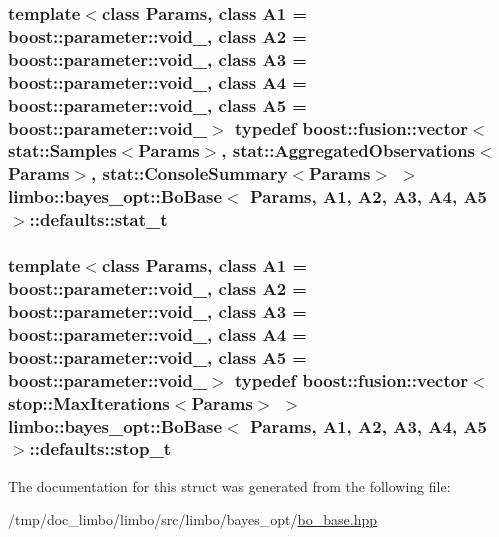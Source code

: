 \subsubsection[{stat\+\_\+t}]{\setlength{\rightskip}{0pt plus 5cm}template$<$class Params, class A1 = boost\+::parameter\+::void\+\_\+, class A2 = boost\+::parameter\+::void\+\_\+, class A3 = boost\+::parameter\+::void\+\_\+, class A4 = boost\+::parameter\+::void\+\_\+, class A5 = boost\+::parameter\+::void\+\_\+$>$ typedef boost\+::fusion\+::vector$<${\bf stat\+::\+Samples}$<$Params$>$, {\bf stat\+::\+Aggregated\+Observations}$<$Params$>$, {\bf stat\+::\+Console\+Summary}$<$Params$>$ $>$ {\bf limbo\+::bayes\+\_\+opt\+::\+Bo\+Base}$<$ Params, A1, A2, A3, A4, A5 $>$\+::{\bf defaults\+::stat\+\_\+t}}\label{structlimbo_1_1bayes__opt_1_1_bo_base_1_1defaults_a70f64f21a85e2fa25063709abd5a2467}
\hypertarget{structlimbo_1_1bayes__opt_1_1_bo_base_1_1defaults_a3cb5d1c8866494a7a641e6f3b4367d75}{}
\subsubsection[{stop\+\_\+t}]{\setlength{\rightskip}{0pt plus 5cm}template$<$class Params, class A1 = boost\+::parameter\+::void\+\_\+, class A2 = boost\+::parameter\+::void\+\_\+, class A3 = boost\+::parameter\+::void\+\_\+, class A4 = boost\+::parameter\+::void\+\_\+, class A5 = boost\+::parameter\+::void\+\_\+$>$ typedef boost\+::fusion\+::vector$<${\bf stop\+::\+Max\+Iterations}$<$Params$>$ $>$ {\bf limbo\+::bayes\+\_\+opt\+::\+Bo\+Base}$<$ Params, A1, A2, A3, A4, A5 $>$\+::{\bf defaults\+::stop\+\_\+t}}\label{structlimbo_1_1bayes__opt_1_1_bo_base_1_1defaults_a3cb5d1c8866494a7a641e6f3b4367d75}


The documentation for this struct was generated from the following file\+:\begin{DoxyCompactItemize}
\item 
/tmp/doc\+\_\+limbo/limbo/src/limbo/bayes\+\_\+opt/\hyperlink{bo__base_8hpp}{bo\+\_\+base.\+hpp}\end{DoxyCompactItemize}
